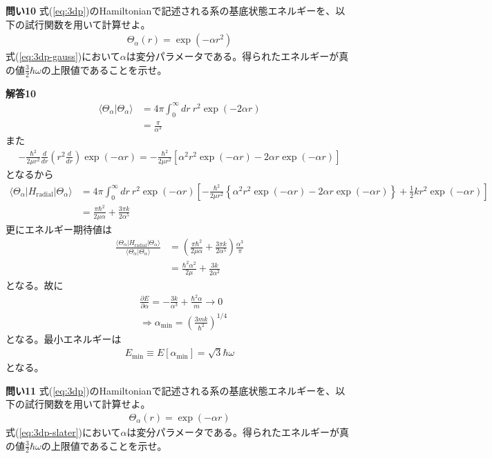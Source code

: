 \documentclass[11pt,pra,aps]{revtex4}
\begin{document}
\noindent
{\bf 問い10} 式(\ref{eq:3dp})のHamiltonianで記述される系の基底状態エネルギーを、以下の試行関数を用いて計算せよ。
\begin{align}
  \Theta_\alpha(r)=\exp(-\alpha r^2) \label{eq:3dp-gauss}
\end{align}
式(\ref{eq:3dp-gauss})において$\alpha$は変分パラメータである。得られたエネルギーが真の値$\frac{3}{2}\hbar\omega$の上限値であることを示せ。

\noindent
{\bf 解答10}
\begin{align}
  \langle\Theta_\alpha|\Theta_\alpha\rangle&=4\pi\int_0^\infty dr \ r^2\exp(-2\alpha r) \nonumber \\
  &=\frac{\pi}{\alpha^3}
\end{align}
また
\begin{align}
  - \frac{\hbar^2}{2\mu r^2}\frac{d}{dr}\left(r^2\frac{d}{dr}\right)\exp(-\alpha r) = - \frac{\hbar^2}{2\mu r^2} \left[\alpha^2 r^2 \exp(-\alpha r) - 2\alpha r \exp(-\alpha r)\right]
\end{align}
となるから
\begin{align}
  \langle\Theta_\alpha|H_\text{radial}|\Theta_\alpha\rangle&=4\pi\int_0^\infty dr \ r^2\exp(-\alpha r)\left[ - \frac{\hbar^2}{2\mu r^2} \left\{\alpha^2 r^2 \exp(-\alpha r) - 2\alpha r \exp(-\alpha r)\right\} + \frac{1}{2}kr^2\exp(-\alpha r)\right] \nonumber \\
  &=\frac{\pi\hbar^2}{2\mu\alpha} + \frac{3\pi k}{2\alpha^5}
\end{align}
更にエネルギー期待値は
\begin{align}
  \frac{\langle\Theta_\alpha|H_\text{radial}|\Theta_\alpha\rangle}{\langle\Theta_\alpha|\Theta_\alpha\rangle} &= \left(\frac{\pi\hbar^2}{2\mu\alpha} + \frac{3\pi k}{2\alpha^5}\right)\frac{\alpha^3}{\pi} \nonumber \\
  &=\frac{\hbar^2\alpha^2}{2\mu} + \frac{3k}{2\alpha^2}
\end{align}
となる。故に
\begin{align}
  &\frac{\partial E}{\partial\alpha} = - \frac{3k}{\alpha^3}+\frac{\hbar^2\alpha}{m}\rightarrow0 \\
  &\Rightarrow \alpha_\text{min} = \left( \frac{3mk}{\hbar^2} \right)^{1/4}
\end{align}
となる。最小エネルギーは
\begin{align}
  E_\text{min}\equiv E[\alpha_\text{min}] = \sqrt{3}\hbar\omega
\end{align}
となる。

\noindent
{\bf 問い11} 式(\ref{eq:3dp})のHamiltonianで記述される系の基底状態エネルギーを、以下の試行関数を用いて計算せよ。
\begin{align}
  \Theta_\alpha(r)=\exp(-\alpha r) \label{eq:3dp-slater}
\end{align}
式(\ref{eq:3dp-slater})において$\alpha$は変分パラメータである。得られたエネルギーが真の値$\frac{3}{2}\hbar\omega$の上限値であることを示せ。
\end{document}
